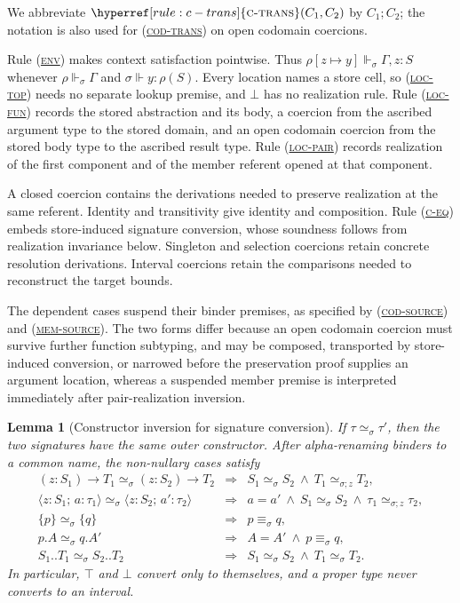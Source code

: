 \documentclass[acmsmall,screen,nonacm]{acmart}
\newtheorem{lemma}[theorem]{Lemma}
\newcommand{\ruleuse}[1]{%
  \hyperref[rule:#1]{\textsc{#1}}}
\newcommand{\ruleref}[1]{%
  \textsc{(\hyperref[rule:#1]{#1})}}
\newcommand{\sing}[1]{\{#1\}}
\newcommand{\pairty}[4]{\langle #1\!:\!#2;\,#3\!:\!#4\rangle}
\newcommand{\realizes}{\Vdash}
\begin{document}
We abbreviate \(\ruleuse{c-trans}(C_1,C_2)\) by \(C_1;C_2\); the notation is
also used for \ruleref{cod-trans} on open codomain coercions.

Rule \ruleref{env} makes context satisfaction pointwise. Thus
\(\rho[z\mapsto y]\realizes_\sigma\Gamma,z:S\) whenever
\(\rho\realizes_\sigma\Gamma\) and
\(\sigma\realizes y:\rho(S)\). Every location names a store cell, so
\ruleref{loc-top} needs no separate lookup premise, and \(\bot\) has no
realization rule. Rule \ruleref{loc-fun} records the stored abstraction and its
body, a coercion from the ascribed argument type to the stored domain, and an
open codomain coercion from the stored body type to the ascribed result type.
Rule \ruleref{loc-pair} records realization of the first component and of the
member referent opened at that component.

A closed coercion contains the derivations needed to preserve realization at
the same referent. Identity and transitivity give identity and composition.
Rule \ruleref{c-eq} embeds store-induced signature conversion, whose soundness
follows from realization invariance below.
Singleton and selection coercions retain concrete resolution derivations.
Interval coercions retain the comparisons needed to reconstruct the target
bounds.

The dependent cases suspend their binder premises, as specified by
\ruleref{cod-source} and \ruleref{mem-source}. The two forms differ because an
open codomain coercion must survive further function subtyping, and may be
composed, transported by store-induced conversion, or narrowed before the
preservation proof supplies an argument location, whereas a suspended member
premise is interpreted immediately after pair-realization inversion.

\begin{lemma}[Constructor inversion for signature conversion]
\label{lem:conversion-structure}
If \(\tau\simeq_\sigma\tau'\), then the two signatures have the same outer
constructor. After alpha-renaming binders to a common name, the non-nullary
cases satisfy
\[
\begin{array}{rcl}
(z:S_1)\to T_1\simeq_\sigma(z:S_2)\to T_2
&\Longrightarrow&
S_1\simeq_\sigma S_2\ \land\ T_1\simeq_{\sigma;z}T_2,
\\[2pt]
\pairty{z}{S_1}{a}{\tau_1}\simeq_\sigma
\pairty{z}{S_2}{a'}{\tau_2}
&\Longrightarrow&
a=a'\ \land\ S_1\simeq_\sigma S_2\ \land\
\tau_1\simeq_{\sigma;z}\tau_2,
\\[2pt]
\sing p\simeq_\sigma\sing q
&\Longrightarrow& p\equiv_\sigma q,
\\[2pt]
p.A\simeq_\sigma q.A'
&\Longrightarrow& A=A'\ \land\ p\equiv_\sigma q,
\\[2pt]
S_1..T_1\simeq_\sigma S_2..T_2
&\Longrightarrow&
S_1\simeq_\sigma S_2\ \land\ T_1\simeq_\sigma T_2.
\end{array}
\]
In particular, \(\top\) and \(\bot\) convert only to themselves, and a
proper type never converts to an interval.
\end{lemma}
\end{document}
